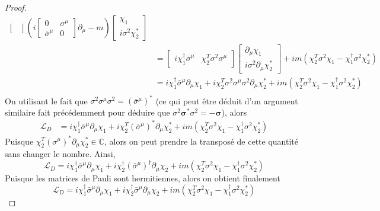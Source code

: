 \documentclass{article}
\numberwithin{equation}{section}
\theoremstyle{solution}
\begin{document}
\begin{proof}
\begin{align*}
\begin{bmatrix}
       \end{bmatrix}      
       \left(  i 
       \begin{bmatrix}
               0 & \sigma^{\mu} \\
               \bar{\sigma}^{\mu} & 0
       \end{bmatrix}
       \partial_\mu - m
        \right)
       \begin{bmatrix}
               \chi_1 \\[1ex] i \sigma^{2}\chi_2^{*}
       \end{bmatrix}
       \\
       &= 
       \begin{bmatrix}
               i\chi_1^{\dagger} \bar{\sigma}^{\mu} &  \chi_2^{T}\sigma^{2} \sigma^{\mu}
       \end{bmatrix}      
       \begin{bmatrix}
              \partial_\mu \chi_1 \\[1ex] i \sigma^{2} \partial_\mu\chi_2^{*}
       \end{bmatrix}
       +
        im(\chi_2^{T} \sigma^{2} \chi_1 - \chi_1^{\dagger} \sigma^{2}\chi_2^{*})
       \\
       &= 
       i \chi_1^{\dagger}\bar{\sigma}^{\mu}\partial_\mu \chi_1 + i\chi_2^{T}\sigma^{2}\sigma^{\mu}\sigma^{2}\partial_\mu \chi_2^{*}
       +
        im(\chi_2^{T} \sigma^{2} \chi_1 - \chi_1^{\dagger} \sigma^{2}\chi_2^{*})
       \\
\end{align*}
On utilisant le fait que $\sigma^{2}\sigma^{\mu}\sigma^{2} = (\bar{\sigma}^{\mu})^{*}$ 
(ce qui peut être déduit d'un argument similaire fait précédemment pour déduire que 
$\sigma^{2}\boldsymbol{ \sigma}^{*}\sigma^{2} = -\boldsymbol{ \sigma}$), alors
\begin{align*}
       \mathcal{L}_D &= 
       i \chi_1^{\dagger}\bar{\sigma}^{\mu}\partial_\mu \chi_1 + i\chi_2^{T}(\bar{\sigma}^{\mu})^{*}\partial_\mu \chi_2^{*}
       +
        im(\chi_2^{T} \sigma^{2} \chi_1 - \chi_1^{\dagger} \sigma^{2}\chi_2^{*})
\end{align*}
Puisque $\chi_2^{T}(\sigma^{\mu})^{*}\partial_\mu \chi_2^{*} \in \mathbb{C}$, alors on peut prendre la transposé de cette quantité sans 
changer le nombre. Ainsi,
\begin{equation}
        \mathcal{L}_D = 
        i \chi_1^{\dagger}\bar{\sigma}^{\mu}\partial_\mu \chi_1 + i\chi_2^{\dagger}(\bar{\sigma}^{\mu})^{\dagger}\partial_\mu \chi_2
       +
        im(\chi_2^{T} \sigma^{2} \chi_1 - \chi_1^{\dagger} \sigma^{2}\chi_2^{*})
\end{equation} 
Puisque les matrices de Pauli sont hermitiennes, alors on obtient finalement
\begin{equation}
        \mathcal{L}_D = 
        i \chi_1^{\dagger}\bar{\sigma}^{\mu}\partial_\mu \chi_1 + i\chi_2^{\dagger}\bar{\sigma}^{\mu}\partial_\mu \chi_2
       +
        im(\chi_2^{T} \sigma^{2} \chi_1 - \chi_1^{\dagger} \sigma^{2}\chi_2^{*})
\end{equation} 

\end{proof}
\end{document}
